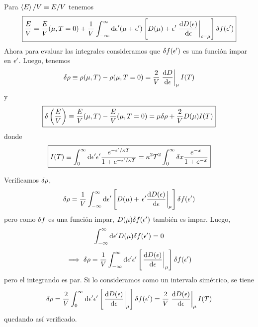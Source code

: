 Para $\ev{E}/V\equiv E/V$ tenemos
\begin{equation}\label{13.star}
  \boxed{\frac{E}{V}= \frac{E}{V}(\m,T=0)+\frac{1}{V}\int_{-\infty}^\infty \dd\ep'(\m+\ep')\left[D(\m )+\ep'\eval{\dv{D(\ep)}{\epsilon}}_{\ep=\m }\right]\d f(\ep ')}
\end{equation}
Ahora para evaluar las integrales consideramos que $\delta f(\epsilon')$ es una función impar en $\epsilon'$. Luego, tenemos
\begin{equation}
  \d\r \equiv \r(\m,T)-\r(\m,T=0)=\frac{2}{V}\eval{\dv{D	}{\epsilon}}_\m I(T)
\end{equation}
y
\begin{equation}
 \boxed{ \delta\left(\frac{E}{V}\right)\equiv\frac{E}{V}(\mu,T)-\frac{E}{V}(\mu,T=0)=\mu\delta\rho +\frac{2}{V}D(\mu )I(T)}
\end{equation}
donde
\begin{equation}
  \boxed{I(T)\equiv \int_0^\infty \dd\epsilon'\epsilon'\frac{e^{-\epsilon'/\kappa T}}{1+e^{-\epsilon'/\kappa T}}=\kappa^2T^2\int_0^\infty \delta x\frac{e^{-x}}{1+e^{-x}}}
\end{equation}

Verificamos $\delta\rho$,
\begin{equation}
  \d\r=\frac{1}{V}\int_{-\infty}^\infty\dd\ep'\left[D(\m )+\eval{\ep'\dv{D(\ep )}{\epsilon}}_\m \right]\d f(\ep')
\end{equation}
pero como $\delta f$ es una función impar, $D(\mu)\delta f(\epsilon')$ también es impar. Luego,
\begin{equation}
  \int_{-\infty}^\infty\dd\epsilon'D(\mu )\delta f(\epsilon')=0
\end{equation}
\begin{equation}
  \implies \d\r=\frac{1}{V}\int_{-\infty}^\infty\dd\ep'\ep'\left[\eval{\dv{D(\ep )}{\epsilon}}_\m \right]\d f(\ep')
\end{equation}
pero el integrando es par. Si lo consideramos como un intervalo simétrico, se tiene
\begin{equation}
  \d\r=\frac{2}{V}\int_0^\infty\dd\ep'\ep'\left[\eval{\dv{D(\ep )}{\epsilon}}_\m \right]\d f(\ep ')=\frac{2}{V}\eval{\dv{D(\ep )}{\epsilon}}_\m I(T) 
\end{equation}
quedando así verificado.

